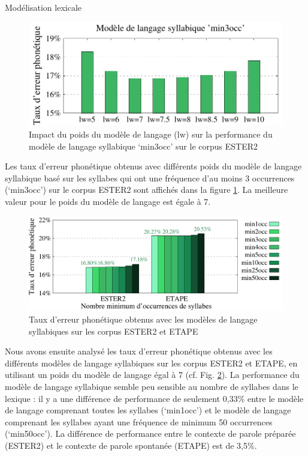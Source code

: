 \documentclass{style/these}
\begin{document}
\begin{part}{Modélisation lexicale}
\begin{figure}[h!]
\centering
\includegraphics[scale=0.72]{images/results/results_syllables_lw_ESTER_v2.pdf}
\caption{Impact du poids du modèle de langage (lw) sur la performance du modèle de langage syllabique `min3occ' sur le corpus ESTER2}
\label{Fig:PER-s-lw}
\end{figure}

Les taux d'erreur phonétique obtenus avec différents poids du modèle de langage syllabique basé sur les syllabes qui ont une fréquence d'au moins 3 occurrences (`min3occ') sur le corpus ESTER2 sont affichés dans la figure \ref{Fig:PER-s-lw}. La meilleure valeur pour le poids du modèle de langage est égale à 7.

\begin{figure}[h!]
\centering
\includegraphics[scale=0.72]{images/results/results_minocc.pdf}
\caption{Taux d'erreur phonétique obtenus avec les modèles de langage syllabiques sur les corpus ESTER2 et ETAPE}
\label{Fig:PER-s}
\end{figure}

Nous avons ensuite analysé les taux d'erreur phonétique obtenus avec les différents modèles de langage syllabiques sur les corpus ESTER2 et ETAPE, en utilisant un poids du modèle de langage égal à 7 (cf. Fig. \ref{Fig:PER-s}). La performance du modèle de langage syllabique semble peu sensible au nombre de syllabes dans le lexique : il y a une différence de performance de seulement 0,33\% entre le modèle de langage comprenant toutes les syllabes (`min1occ') et le modèle de langage comprenant les syllabes ayant une fréquence de minimum 50 occurrences (`min50occ').  La différence de performance entre le contexte de parole préparée (ESTER2) et le contexte de parole spontanée (ETAPE) est de 3,5\%.  


\end{part}
\end{document}
